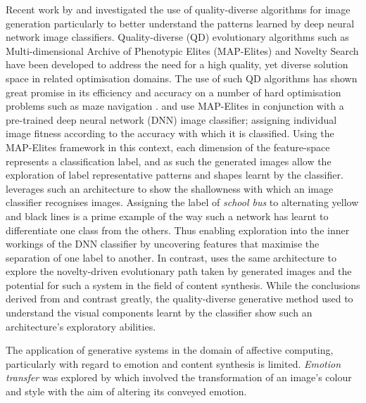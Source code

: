 \documentclass{article}
\begin{document}
Recent work by \citet{nguyen2015innovation} and \citet{nguyen2015deep} investigated the use of quality-diverse algorithms for image generation particularly to better understand the patterns learned by deep neural network image classifiers.
Quality-diverse (QD) evolutionary algorithms such as Multi-dimensional Archive of Phenotypic Elites (MAP-Elites) \citep{mouret2015illuminating} and Novelty Search \citep{lehman2008exploiting, lehman2011abandoning} have been developed to address the need for a high quality, yet diverse solution space in related optimisation domains.
The use of such QD algorithms has shown great promise in its efficiency and accuracy on a number of hard optimisation problems \citep{pugh2016quality} such as maze navigation \citep{lehman2011abandoning}.
\citet{nguyen2015deep} and \citet{nguyen2015innovation} use MAP-Elites in conjunction with a pre-trained deep neural network (DNN) image classifier; assigning individual image fitness according to the accuracy with which it is classified.
Using the MAP-Elites framework in this context, each dimension of the feature-space represents a classification label, and as such the generated images allow the exploration of label representative patterns and shapes learnt by the classifier.
\citet{nguyen2015deep} leverages such an architecture to show the shallowness with which an image classifier recognises images.
Assigning the label of \textit{school bus} to alternating yellow and black lines is a prime example of the way such a network has learnt to differentiate one class from the others.
Thus enabling exploration into the inner workings of the DNN classifier by uncovering features that maximise the separation of one label to another.
In contrast, \citet{nguyen2015innovation} uses the same architecture to explore the novelty-driven evolutionary path taken by generated images and the potential for such a system in the field of content synthesis.
While the conclusions derived from \citet{nguyen2015innovation} and \citet{nguyen2015deep} contrast greatly, the quality-diverse generative method used to understand the visual components learnt by the classifier show such an architecture's exploratory abilities.




The application of generative systems in the domain of affective computing, particularly with regard to emotion and content synthesis is limited.
\textit{Emotion transfer} was explored by \citet{ali2017emotional} which involved the transformation of an image's colour and style with the aim of altering its conveyed emotion.
\end{document}
